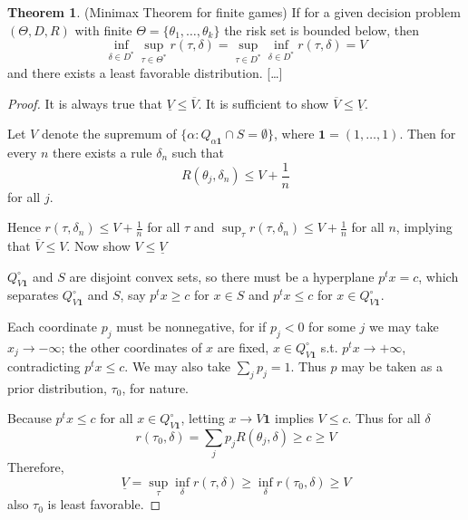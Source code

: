 \documentclass{scrartcl}
\theoremstyle{definition}
\theoremstyle{theorem}
\newtheorem{theorem}{Theorem}
\begin{document}
\begin{theorem}(Minimax Theorem for finite games)
	If for a given decision problem $(\Theta,D,R)$ with finite $\Theta=\{\theta_1,\dots,\theta_k\}$ the risk set is bounded below, then
	\[
	\inf_{\delta\in D^\ast}\sup_{\tau\in \Theta^\ast}r(\tau,\delta)=\sup_{\tau\in D^\ast}\inf_{\delta\in D^\ast} r(\tau,\delta)=V
	\]
	and there exists a least favorable distribution. [\dots]
\end{theorem}
\begin{proof}
	It is always true that $\underline{V}\leq \overline{V}$. It is sufficient to show $\overline{V}\leq \underline{V}$.
	
	Let $V$ denote the supremum of $\{\alpha:Q_{\alpha\mathbf{1}}\cap S=\emptyset\}$, where $\mathbf{1}=(1,\dots,1)$. Then for every $n$ there exists a rule $\delta_n$ such that
	\[
	R(\theta_j,\delta_n)\leq V+\frac{1}{n}
	\]
	for all $j$.
	
	Hence $r(\tau,\delta_n)\leq V+\frac{1}{n}$ for all $\tau$ and $\sup_\tau r(\tau,\delta_n)\leq V+\frac{1}{n}$ for all $n$, implying that $\overline{V}\leq V$. Now show $V\leq \underline{V}$
	
	$Q_{V\mathbf{1}}^\circ$ and $S$ are disjoint convex sets, so there must be a hyperplane $p^tx=c$, which separates $Q_{V\mathbf{1}}^\circ$ and $S$, say $p^tx\geq c$ for $x\in S$ and $p^tx\leq c$ for $x\in Q_{V\mathbf{1}}^\circ$.
	
	Each coordinate $p_j$ must be nonnegative, for if $p_j<0$ for some $j$ we may take $x_j\to -\infty$; the other coordinates of $x$ are fixed, $x\in Q_{V\mathbf{1}}^\circ$ s.t. $p^tx\to +\infty$, contradicting $p^tx\leq c$. We may also take $\sum_j p_j=1$. Thus $p$ may be taken as a prior distribution, $\tau_0$, for nature.
	
	Because $p^tx\leq c$ for all $x\in Q_{V\mathbf{1}}^\circ$, letting $x\to V\mathbf{1}$ implies $V\leq c$. Thus for all $\delta$
	\[
	r(\tau_0,\delta)=\sum_j p_jR(\theta_j,\delta)\geq c\geq V
	\]
	Therefore,
	\[
	\underline{V}=\sup_\tau\inf_\delta r(\tau,\delta)\geq\inf_\delta r(\tau_0,\delta)\geq V
	\]
	also $\tau_0$ is least favorable.
	\end{proof}
\end{document}
